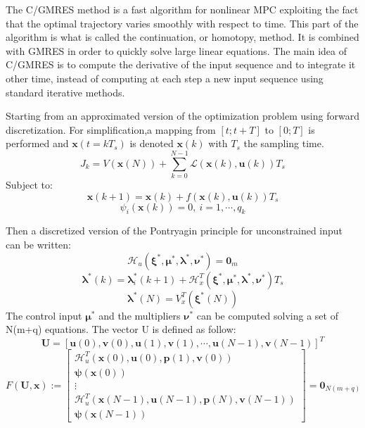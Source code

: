 \documentclass[a4paper, 12pt]{report}
\begin{document}
The C/GMRES method is a fast algorithm for nonlinear MPC exploiting the fact that the optimal trajectory varies smoothly with respect to time. This part of the algorithm is what is called the continuation, or homotopy, method. It is combined with GMRES in order to quickly solve large linear equations. The main idea of C/GMRES is to compute the derivative of the input sequence and to integrate it other time, instead of computing at each step a new input sequence using standard iterative methods.

Starting from an approximated version of the optimization problem using forward discretization. For simplification,a mapping from $[t; t+T]$ to $[0; T]$ is performed and $\boldsymbol{x}(t = kT_s)$ is denoted $\boldsymbol{x}(k)$ with $T_s$ the sampling time.
\[ J_k = V(\boldsymbol{x}(N)) + \sum_{k = 0}^{N-1} \mathcal{L}(\boldsymbol{x}(k), \boldsymbol{u}(k))T_s \]
Subject to:
\[ \boldsymbol{x}(k+1) = \boldsymbol{x}(k) + f(\boldsymbol{x}(k),\boldsymbol{u}(k))T_s \]
\[ \psi_i(\boldsymbol{x}(k)) = 0,\ i = 1, \cdots, q_k \]

Then a discretized version of the Pontryagin principle for unconstrained input can be written:
\[ \mathcal{H}_u(\boldsymbol{\xi}^*, \boldsymbol{\mu}^*, \boldsymbol{\lambda}^*, \boldsymbol{\nu}^*) = \boldsymbol{0}_m \]
\[ \boldsymbol{\lambda}^*(k)  = \boldsymbol{\lambda}_i^*(k+1) + \mathcal{H}_x^T(\boldsymbol{\xi}^*, \boldsymbol{\mu}^*, \boldsymbol{\lambda}^*, \boldsymbol{\nu}^*) T_s\]
\[ \boldsymbol{\lambda}^*(N) = V_x^T(\boldsymbol{\xi}^*(N)) \]
The control input $\boldsymbol{\mu}^*$ and the multipliers $\boldsymbol{\nu}^*$ can be computed solving a set of N(m+q) equations. The vector U is defined as follow:
\[\boldsymbol{U} = [\boldsymbol{u}(0), \boldsymbol{v}(0), \boldsymbol{u}(1), \boldsymbol{v}(1), \cdots, \boldsymbol{u}(N-1), \boldsymbol{v}(N-1)]^T \]
\[F(\boldsymbol{U},\boldsymbol{x}) := \begin{bmatrix} \mathcal{H}_u^T(\boldsymbol{x}(0), \boldsymbol{u}(0), \boldsymbol{p}(1), \boldsymbol{v}(0)) \\ \boldsymbol{\psi}(\boldsymbol{x}(0)) \\ \vdots \\ \mathcal{H}^T_u (\boldsymbol{x}(N-1), \boldsymbol{u}(N-1), \boldsymbol{p}(N), \boldsymbol{v}(N-1)) \\ \boldsymbol{\psi}(\boldsymbol{x}(N-1))\end{bmatrix} = \boldsymbol{0}_{N(m+q)}\]
\end{document}

